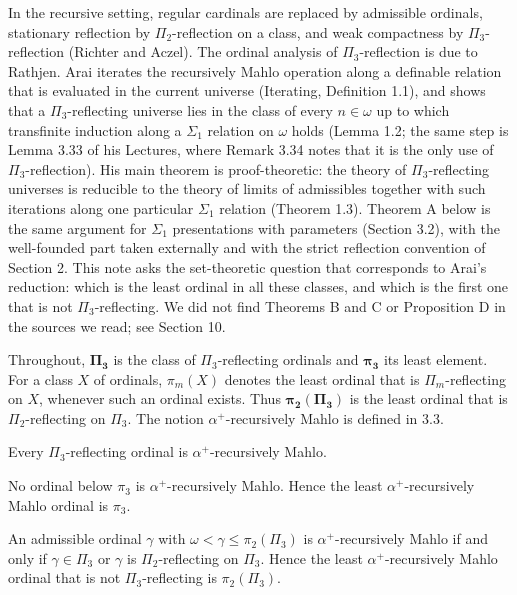 \documentclass[11pt]{article}
\begin{document}
In the recursive setting, regular cardinals are replaced by admissible ordinals, stationary reflection by
$\Pi_2$-reflection on a class, and weak compactness by $\Pi_3$-reflection (Richter and Aczel). The ordinal analysis
of $\Pi_3$-reflection is due to Rathjen. Arai iterates the recursively Mahlo operation along a definable relation
that is evaluated in the current universe (Iterating, Definition 1.1), and shows that a $\Pi_3$-reflecting universe
lies in the class of every $n \in \omega$ up to which transfinite induction along a $\Sigma_1$ relation on $\omega$ holds
(Lemma 1.2; the same step is Lemma 3.33 of his Lectures, where Remark 3.34 notes that it is the only use of
$\Pi_3$-reflection). His main theorem is proof-theoretic: the theory of $\Pi_3$-reflecting universes is reducible to
the theory of limits of admissibles together with such iterations along one particular $\Sigma_1$ relation
(Theorem 1.3). Theorem A below is the same argument for $\Sigma_1$ presentations with parameters (Section 3.2), with
the well-founded part taken externally and with the strict reflection convention of Section 2. This note asks the
set-theoretic question that corresponds to Arai's reduction: which is the least ordinal in all these classes, and
which is the first one that is not $\Pi_3$-reflecting. We did not find Theorems B and C or Proposition D in the
sources we read; see Section 10.

Throughout, $\boldsymbol{\Pi_3}$ is the class of $\Pi_3$-reflecting ordinals and $\boldsymbol{\pi_3}$ its least
element. For a class $X$ of ordinals, $\pi_m(X)$ denotes the least ordinal that is $\Pi_m$-reflecting on $X$,
whenever such an ordinal exists. Thus $\boldsymbol{\pi_2(\Pi_3)}$ is the least ordinal that is $\Pi_2$-reflecting
on $\Pi_3$. The notion
$\alpha^+$-recursively Mahlo is defined in 3.3.

\begin{statement} Every $\Pi_3$-reflecting ordinal is $\alpha^+$-recursively Mahlo.
\end{statement}

\begin{statement} No ordinal below $\pi_3$ is $\alpha^+$-recursively Mahlo. Hence the least $\alpha^+$-recursively Mahlo ordinal is $\pi_3$.
\end{statement}

\begin{statement} An admissible ordinal $\gamma$ with $\omega < \gamma \le \pi_2(\Pi_3)$ is $\alpha^+$-recursively Mahlo if and
only if $\gamma \in \Pi_3$ or $\gamma$ is $\Pi_2$-reflecting on $\Pi_3$. Hence the least $\alpha^+$-recursively Mahlo ordinal that is not
$\Pi_3$-reflecting is $\pi_2(\Pi_3)$.
\end{statement}
\end{document}
